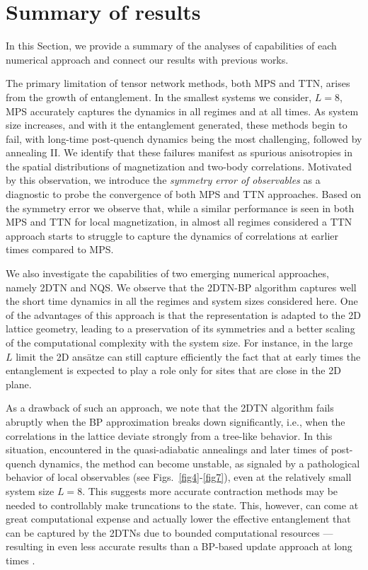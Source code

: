 \documentclass[aps,pra,reprint,amssymb,superscriptaddress]{revtex4-2}
\begin{document}
\section{Summary of results}
\label{sec7_v2} 

In this Section, we provide a summary of the analyses of capabilities of each numerical approach 
and connect our results with previous works.

The primary limitation of tensor network methods, both MPS and TTN, arises from the growth of entanglement. In the smallest systems we consider, $L=8$, MPS accurately captures the dynamics in all regimes and at all times. As system size increases, and with it the entanglement generated, these methods begin to fail, with long-time post-quench dynamics being the most challenging, followed by annealing II. We identify that these failures manifest as spurious anisotropies in the spatial distributions of magnetization and two-body correlations. Motivated by this observation, we introduce the \textit{symmetry error of observables} as a diagnostic to probe the convergence of both MPS and TTN approaches. Based on the symmetry error we observe that, while a similar performance is seen in both MPS and TTN for local magnetization, in almost all regimes considered a TTN approach starts to struggle to capture the dynamics of correlations at earlier times compared to MPS.

We also investigate the capabilities of two emerging numerical approaches, namely 2DTN and NQS.
We observe that the 2DTN-BP algorithm captures well the short time dynamics in all the regimes and system sizes considered here. One of the advantages of this approach is that the representation is adapted to the 2D lattice geometry, leading to a preservation of its symmetries and
a better scaling of the computational complexity with the system size. For instance, in the large $L$ limit the 2D ansätze can still capture efficiently the fact that at early times the entanglement is expected to play a role only for sites that are close in the 2D plane.

As a drawback of such an approach, we note that the 2DTN algorithm fails abruptly when the BP approximation breaks down significantly, i.e., when the correlations in the lattice deviate strongly from a tree-like behavior. In this situation, encountered in the quasi-adiabatic annealings and later times of post-quench dynamics, the method can become unstable, as signaled by a pathological behavior of local observables (see Figs.~\ref{fig4}-\ref{fig7}), even at the relatively small system size $L=8$. This suggests more accurate contraction methods may be needed to controllably make truncations to the state. This, however, can come at great computational expense and actually lower the effective entanglement that can be captured by the 2DTNs due to bounded computational resources --- resulting in even less accurate results than a BP-based update approach at long times \cite{kim_evidence_2023, king_beyond-classical_2025, tindall_dynamics_2025}.
\end{document}
